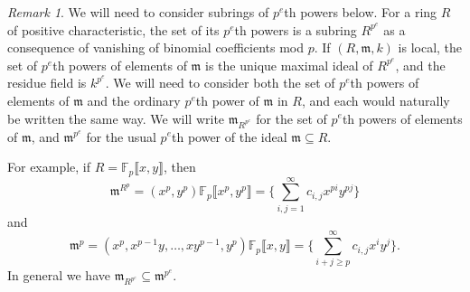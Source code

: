\documentclass{amsart}[12pt]
\newcommand{\F}{\mathbb{F}}
\newcommand{\fm}{{\mathfrak m}}
\numberwithin{equation}{section}
\theoremstyle{plain} %
\theoremstyle{definition}
\theoremstyle{remark}
\newtheorem{rem}[equation]{Remark}
\begin{document}
\begin{rem} We will need to consider subrings of $p^e$th powers below. For a ring $R$ of positive characteristic, the set of its $p^e$th powers is a subring $R^{p^e}$ as a consequence of vanishing of binomial coefficients mod $p$. If $(R,\fm,k)$ is local, the set of $p^e$th powers of elements of $\fm$ is the unique maximal ideal of $R^{p^e}$, and the residue field is $k^{p^e}$. We will need to consider both the set of $p^e$th powers of elements of $\fm$ and the ordinary $p^e$th power of $\fm$ in $R$, and each would naturally be written the same way. We will write $\fm_{R^{p^e}}$ for the set of $p^e$th powers of elements of $\fm$, and $\fm^{p^e}$ for the usual $p^e$th power of the ideal $\fm\subseteq R$.

For example, if $R=\F_p\llbracket x,y\rrbracket$, then \[ \fm^{R^{p}} = (x^{p},y^p)\F_p\llbracket x^p,y^p\rrbracket = \{ \sum_{i,j=1}^\infty c_{i,j} x^{pi} y^{pj} \}\]
and \[\fm^p = (x^p, x^{p-1} y, \dots, x y^{p-1}, y^p) \F_p\llbracket x,y\rrbracket = \{ \sum_{i+j \geq p }^\infty c_{i,j} x^{i} y^{j} \}.\] In general we have  $\fm_{R^{p^e}} \subseteq \fm^{p^e}$.
\end{rem}
\end{document}
